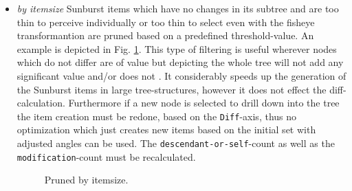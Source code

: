 \begin{itemize}
\item \emph{by itemsize} Sunburst items which have no changes in its subtree and are too thin to perceive individually or too thin to select even with the fisheye transformantion are pruned based on a predefined threshold-value. An example is depicted in Fig. \ref{fig:pruned-by-itemsize}. This type of filtering is useful wherever nodes which do not differ are of value but depicting the whole tree will not add any significant value and/or does not . It considerably speeds up the generation of the Sunburst items in large tree-structures, however it does not effect the diff-calculation. Furthermore if a new node is selected to drill down into the tree the item creation must be redone, based on the \texttt{Diff}-axis, thus no optimization which just creates new items based on the initial set with adjusted angles can be used. The \texttt{descendant-or-self}-count as well as the \texttt{modification}-count must be recalculated. 

\begin{figure}[tb]
\caption{\label{fig:pruned-by-itemsize} Pruned by itemsize.}
\end{figure}


\end{itemize}
